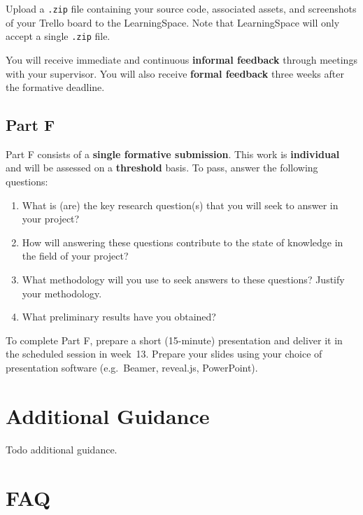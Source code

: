 \documentclass{../fal_assignment}
\begin{document}
Upload a \texttt{.zip} file containing your source code, associated assets, and screenshots of your Trello board to the LearningSpace.
Note that LearningSpace will only accept a single \texttt{.zip} file.

You will receive immediate and continuous \textbf{informal feedback} through meetings with your supervisor.
You will also receive \textbf{formal feedback} three weeks after the formative deadline.

\subsection*{Part F}

Part F consists of a \textbf{single formative submission}.
This work is \textbf{individual} and will be assessed on a \textbf{threshold} basis.
To pass, answer the following questions:

\begin{enumerate}[label=(\roman*)]
	\item What is (are) the key research question(s) that you will seek to
		answer in your project?
	\item How will answering these questions contribute to the state of knowledge
		in the field of your project?
	\item What methodology will you use to seek answers to these questions?
		Justify your methodology.
	\item What preliminary results have you obtained?
\end{enumerate}

To complete Part F, prepare a short (15-minute) presentation 
and deliver it in the scheduled session in week~13.
Prepare your slides using your choice of presentation software
(e.g.\ Beamer, reveal.js, PowerPoint).

\section*{Additional Guidance}

Todo additional guidance.

\section*{FAQ}
\end{document}
